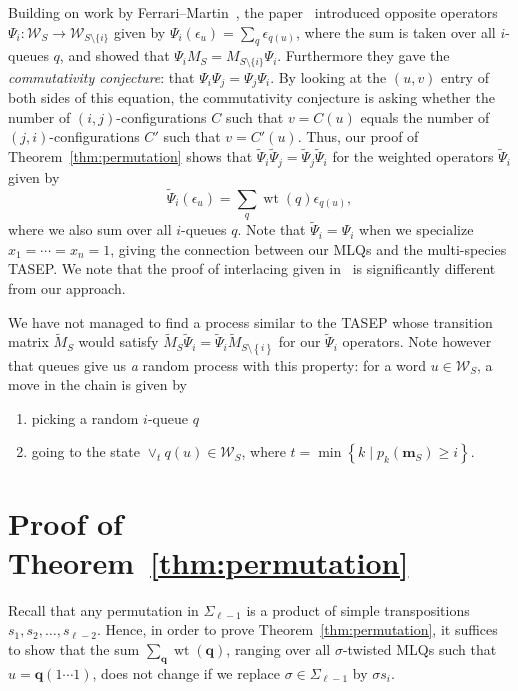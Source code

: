 \documentclass[reqno]{amsart}
\newcommand{\0}{\phantom{c}}
\newcommand{\merge}[1]{\vee_{#1}} %
\newcommand{\SymGp}[1]{\Sigma_{#1}} %
\DeclareMathOperator{\wt}{wt} %
\newcommand{\mm}{\mathbf{m}}
\newcommand{\qq}{\mathbf{q}}
\newcommand{\mcW}{\mathcal{W}}
\let\sumnonlimits\sum
\renewcommand{\sum}{\sumnonlimits\limits}
\newcommand{\set}[1]{\left\{ #1 \right\}}
\newcommand{\defn}[1]{{\color{darkred}\emph{#1}}} %
\theoremstyle{plain}
\theoremstyle{definition}
\numberwithin{equation}{section}
\begin{document}
Building on work by Ferrari--Martin~\cite{FM06}, the paper~\cite{AAMP} introduced opposite operators $\Psi_i \colon \mcW_S \to \mcW_{S \setminus \{i\}}$ given by $\Psi_i(\epsilon_u) = \sum_{q} \epsilon_{q(u)}$, where the sum is taken over all $i$-queues $q$, and showed that $\Psi_i M_S = M_{S \setminus \{i\}} \Psi_i$.
Furthermore they gave the \defn{commutativity conjecture}: that $\Psi_i \Psi_j = \Psi_j \Psi_i$.
By looking at the $(u,v)$ entry of both sides of this equation, the commutativity conjecture is asking whether the number of $(i,j)$-configurations $C$ such that $v = C(u)$ equals the number of $(j,i)$-configurations $C'$ such that $v = C'(u)$. 
Thus, our proof of Theorem~\ref{thm:permutation} shows that $\widetilde{\Psi}_i \widetilde{\Psi}_j = \widetilde{\Psi}_j \widetilde{\Psi}_i$ for the weighted operators $\widetilde{\Psi}_i$ given by
\[
\widetilde{\Psi}_i(\epsilon_u) = \sum_q \wt(q) \epsilon_{q(u)},
\]
where we also sum over all $i$-queues $q$.
Note that $\widetilde{\Psi}_i = \Psi_i$ when we specialize $x_1 = \cdots = x_n = 1$, giving the connection between our MLQs and the multi-species TASEP.
We note that the proof of interlacing given in~\cite{AAMP} is significantly different from our approach.

We have not managed to find a process similar to the TASEP whose transition matrix $\widetilde{M}_S$ would satisfy $\widetilde{M}_S \widetilde{\Psi}_i = \widetilde{\Psi}_i \widetilde{M}_{S \setminus \set{i}}$ for our $\widetilde{\Psi}_i$ operators.
Note however that queues give us \emph{a} random process with this property: for a word $u \in \mcW_S$, a move in the chain is given by
\begin{enumerate}
\item picking a random $i$-queue $q$
\item going to the state $\merge{t} q(u) \in \mcW_S$, where $t = \min\set{k \mid p_k(\mm_S) \geq i}$.
\end{enumerate}









\section{Proof of Theorem~\ref{thm:permutation}}
\label{sec:thm_proof}

Recall that any permutation in $\SymGp{\ell-1}$ is a product of simple transpositions
$s_1, s_2, \ldots, s_{\ell-2}$.
Hence, in order to prove Theorem~\ref{thm:permutation}, it suffices to show that
the sum $\sum_{\qq} \wt(\qq)$,
ranging over all $\sigma$-twisted MLQs such that $u = \qq(1\dotsm 1)$,
does not change if we replace $\sigma \in \SymGp{\ell-1}$ by $\sigma s_i$.
\end{document}
